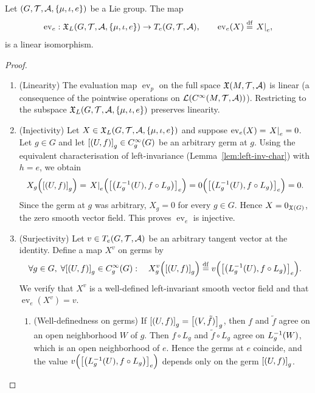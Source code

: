 \documentclass[11pt,reqno]{amsart}
\begin{document}
\begin{Thm}
\label{thm:ev-e-isomorphism}
Let $(G,\T,\A,\set{\mu,\iota,e})$ be a Lie group.
The map
\[
\operatorname{ev}_e:\X_L(G,\T,\A,\set{\mu,\iota,e})\to T_e(G,\T,\A),\qquad
\operatorname{ev}_e(X)\df \eval{X}_{e},
\]
is a linear isomorphism.
\end{Thm}
\begin{proof}
\begin{enumerate}
\item (Linearity)
The evaluation map $\operatorname{ev}_p$ on the full space $\mathfrak{X}(M,\mathcal{T},\mathcal{A})$
is linear (a consequence of the pointwise operations on
$\L\Br{C^\infty(M,\T,\A)}$).  Restricting to the subspace
$\X_L(G,\T,\A,\set{\mu,\iota,e})$ preserves linearity.

\item (Injectivity)
Let $X\in\X_L(G,\T,\A,\set{\mu,\iota,e})$ and suppose
$\operatorname{ev}_e(X)=\eval{X}_{e}=0$.
Let $g\in G$ and let $\SqBr{(U,f)}_{g}\in C_{g}^\infty(G)$ be an
arbitrary germ at $g$.
Using the equivalent characterisation of left-invariance
(Lemma~\ref{lem:left-inv-char}) with $h=e$, we obtain
\[
X_g\Br{\SqBr{(U,f)}_{g}}
=\eval{X}_{e}\Br{\SqBr{\Br{L_g\inv(U),f\circ L_g}}_{e}}
=0\Br{\SqBr{\Br{L_g\inv(U),f\circ L_g}}_{e}}
=0.
\]
Since the germ at $g$ was arbitrary, $X_g=0$ for every $g\in G$.
Hence $X=0_{\mathfrak{X}(G)}$, the zero smooth vector field.
This proves $\operatorname{ev}_e$ is injective.

\item (Surjectivity)
Let $v\in T_e(G,\mathcal{T},\mathcal{A})$ be an arbitrary tangent vector at the identity.
Define a map $X^v$ on germs by
\[
\forall g\in G,\;\forall\SqBr{(U,f)}_{g}\in C_{g}^\infty(G):\quad
X^v_g\Br{\SqBr{(U,f)}_{g}}\df
v\Br{\SqBr{\Br{L_g\inv(U),f\circ L_g}}_{e}}.
\]
We verify that $X^v$ is a well-defined left-invariant smooth vector field
and that $\operatorname{ev}_e(X^v)=v$.

\begin{enumerate}
\item (Well-definedness on germs)
If $\SqBr{(U,f)}_{g}=\SqBr{(V,\tilde f)}_{g}$, then
$f$ and $\tilde f$ agree on an open neighborhood $W$ of $g$.
Then $f\circ L_g$ and $\tilde f\circ L_g$ agree on $L_g^{-1}(W)$,
which is an open neighborhood of $e$.
Hence the germs at $e$ coincide, and the value
$v\Br{\SqBr{\Br{L_g\inv(U),f\circ L_g}}_{e}}$
depends only on the germ $\SqBr{(U,f)}_{g}$.


\end{enumerate}
\end{enumerate}
\end{proof}
\end{document}
